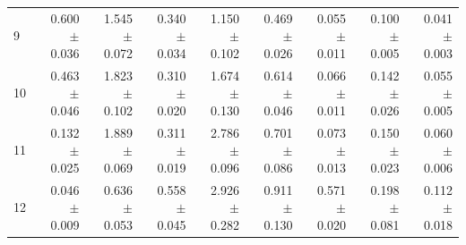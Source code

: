 \documentclass[10pt]{article}
\begin{document}
\begin{table}[h]
\begin{tabular}{lrrrrrrrr}
9 & 0.600 $\pm$ 0.036 & 1.545 $\pm$ 0.072 & 0.340 $\pm$ 0.034 & 1.150 $\pm$ 0.102 & 0.469 $\pm$ 0.026 & 0.055 $\pm$ 0.011 & 0.100 $\pm$ 0.005 & 0.041 $\pm$ 0.003 \\
10 & 0.463 $\pm$ 0.046 & 1.823 $\pm$ 0.102 & 0.310 $\pm$ 0.020 & 1.674 $\pm$ 0.130 & 0.614 $\pm$ 0.046 & 0.066 $\pm$ 0.011 & 0.142 $\pm$ 0.026 & 0.055 $\pm$ 0.005 \\
11 & 0.132 $\pm$ 0.025 & 1.889 $\pm$ 0.069 & 0.311 $\pm$ 0.019 & 2.786 $\pm$ 0.096 & 0.701 $\pm$ 0.086 & 0.073 $\pm$ 0.013 & 0.150 $\pm$ 0.023 & 0.060 $\pm$ 0.006 \\
12 & 0.046 $\pm$ 0.009 & 0.636 $\pm$ 0.053 & 0.558 $\pm$ 0.045 & 2.926 $\pm$ 0.282 & 0.911 $\pm$ 0.130 & 0.571 $\pm$ 0.020 & 0.198 $\pm$ 0.081 & 0.112 $\pm$ 0.018 \\
\bottomrule
\end{tabular}
\end{table}
\end{document}
